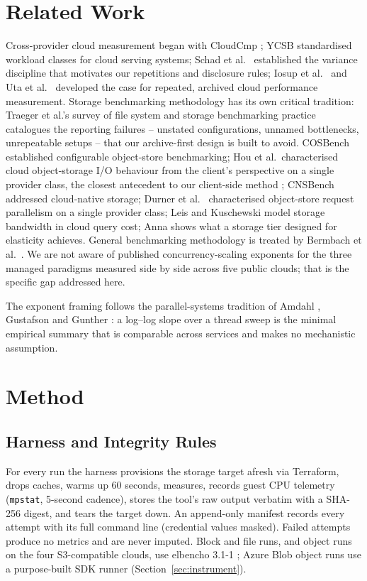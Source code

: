 \documentclass[manuscript,screen,review]{acmart}
\begin{document}
\section{Related Work}
Cross-provider cloud measurement began with CloudCmp \cite{cloudcmp}; YCSB
\cite{ycsb} standardised workload classes for cloud serving systems; Schad et
al.\ \cite{schad} established the variance discipline that motivates our
repetitions and disclosure rules; Iosup et al.\ \cite{iosup} and Uta et
al.\ \cite{uta} developed the case for repeated, archived cloud performance
measurement. Storage benchmarking methodology has its own critical tradition:
Traeger et al.'s survey of file system and storage benchmarking practice
\cite{traeger} catalogues the reporting failures -- unstated configurations,
unnamed bottlenecks, unrepeatable setups -- that our archive-first design is
built to avoid. COSBench \cite{cosbench} established configurable object-store
benchmarking; Hou et al.\ characterised cloud object-storage I/O
behaviour from the client's perspective on a single provider class,
the closest antecedent to our client-side method \cite{hou}; CNSBench \cite{cnsbench} addressed cloud-native storage; Durner
et al.\ \cite{durner} characterised object-store request parallelism on a
single provider class; Leis and Kuschewski \cite{leis} model storage bandwidth
in cloud query cost; Anna \cite{anna} shows what a storage tier designed for
elasticity achieves. General benchmarking methodology is treated by Bermbach
et al.\ \cite{bermbach}. We are not aware of published concurrency-scaling
exponents for the three managed paradigms measured side by side across five
public clouds; that is the specific gap addressed here.

The exponent framing follows the parallel-systems tradition of Amdahl
\cite{amdahl}, Gustafson \cite{gustafson} and Gunther \cite{gunther}: a
log--log slope over a thread sweep is the minimal empirical summary that is
comparable across services and makes no mechanistic assumption.

\section{Method}
\subsection{Harness and Integrity Rules}
For every run the harness provisions the storage target afresh via Terraform,
drops caches, warms up 60 seconds, measures, records guest CPU telemetry
(\texttt{mpstat}, 5-second cadence), stores the tool's raw output verbatim
with a SHA-256 digest, and tears the target down. An append-only manifest
records every attempt with its full command line (credential values masked).
Failed attempts produce no metrics and are never imputed. Block and file runs,
and object runs on the four S3-compatible clouds, use elbencho 3.1-1
\cite{elbencho}; Azure Blob object runs use a purpose-built SDK runner
(Section~\ref{sec:instrument}).
\end{document}
